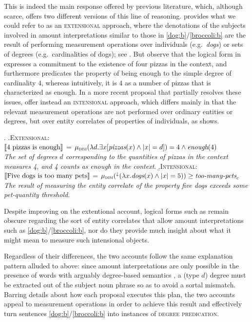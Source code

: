 \documentclass[a4paper,12pt,twoside]{article}
\newcommand{\sv}[1]{\ensuremath{\llbracket\textnormal{#1}\rrbracket}}
\begin{document}
	This is indeed the main response offered by previous literature, which, although scarce, offers two different versions of this line of reasoning. \citet{Rett:2014,Rett:2018} provides what we could refer to as an \textsc{extensional} approach, where the denotations of the subjects involved in amount interpretations similar to those in \ref{dog:b}/\ref{broccoli:b} are the result of performing measurement operations over individuals (e.g.\ \textit{dogs}) or sets of degrees (e.g.\ cardinalities of dogs); see \Next[a]. But observe that the logical form in \Next[a] expresses a commitment to the existence of four pizzas in the context, and furthermore predicates the property of being enough to the simple degree of cardinality $4$, whereas intuitively, it is 4 as a number  of pizzas that is characterized as enough. In a more recent proposal that partially resolves these issues, \citet{Mendia&Espinal:2024a} offer instead an \textsc{intensional} approach, which differs mainly in that the relevant measurement operations are not performed over ordinary entities or degrees, but over entity correlates of properties of individuals, as \Next[b] shows. 
	
	\ex.
	\a.\textsc{Extensional}: \\
	\sv{\textnormal{4 pizzas is enough}} = $\mu_{\textsc{dim}}(\lambda d . \exists x [\textit{pizzas}(x) \wedge |x| = d]) = 4 \wedge \textit{enough}(4)$\\
	\textit{The set of
		degrees $d$ corresponding to the quantities of pizzas in the context measures 4, and 4 counts as enough in the
		context}.
        \newpage
	\b.\label{intensional}\textsc{Intensional}:\\
	\sv{\textnormal{Five dogs is too many pets}} = $\mu_{\textsc{dim}}(^{\downarrow}(\lambda x . \textit{dogs}(x) \wedge |x| = 5)) \geq \textit{too-many-pets}_c$\\
	\textit{The result of measuring the entity correlate of the property \textit{five dogs} exceeds some pet-quantity threshold}.
	
	Despite improving on the extentional account, logical forms such as \Last[b] remain obscure regarding the sort of entity correlates that allow amount interpretations such as \ref{dog:b}/\ref{broccoli:b}, nor do they provide much insight about what it might mean to measure such intensional objects. 
	
	Regardless of their differences, the two accounts follow the same explanation pattern alluded to above: since amount interpretations are only possible in the presence of words with arguably  degree-based semantics \citep{Rett:2008,Solt:2015}, a (type $d$) degree must be extracted out of the subject noun phrase so as to avoid a sortal mismatch. Barring details about how each proposal executes this plan, the two accounts appeal to measurement operations in order to achieve this result and effectively turn sentences \ref{dog:b}/\ref{broccoli:b} into instances of \textsc{degree predication}.
	
\end{document}
